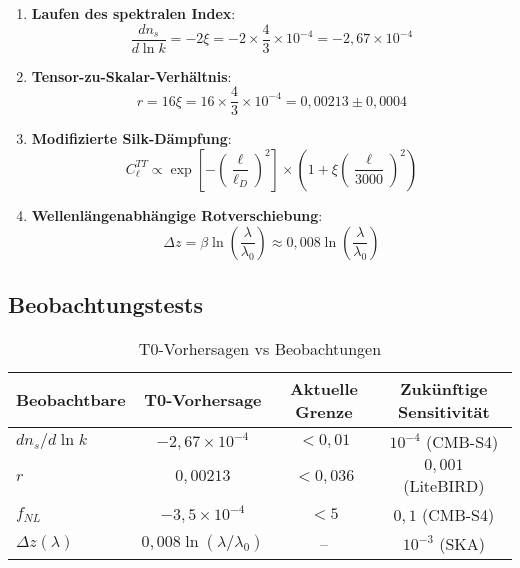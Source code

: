 \documentclass[12pt,a4paper]{article}
\newcommand{\xipar}{\xi}
\theoremstyle{definition}
\theoremstyle{remark}
\begin{document}
	\begin{enumerate}
		\item \textbf{Laufen des spektralen Index}:
		\begin{equation}
			\frac{dn_s}{d\ln k} = -2\xipar = -2 \times \frac{4}{3} \times 10^{-4} = -2,67 \times 10^{-4}
		\end{equation}
		
		\item \textbf{Tensor-zu-Skalar-Verh\"altnis}:
		\begin{equation}
			r = 16\xipar = 16 \times \frac{4}{3} \times 10^{-4} = 0,00213 \pm 0,0004
		\end{equation}
		
		\item \textbf{Modifizierte Silk-D\"ampfung}:
		\begin{equation}
			C_\ell^{TT} \propto \exp\left[-\left(\frac{\ell}{\ell_D}\right)^2\right] \times \left(1 + \xipar \left(\frac{\ell}{3000}\right)^2\right)
		\end{equation}
		
		\item \textbf{Wellenl\"angenabh\"angige Rotverschiebung}:
		\begin{equation}
			\Delta z = \beta \ln\left(\frac{\lambda}{\lambda_0}\right) \approx 0,008 \ln\left(\frac{\lambda}{\lambda_0}\right)
		\end{equation}
	\end{enumerate}
	
	\subsection{Beobachtungstests}
	
	\begin{table}[htbp]
		\centering
		\caption{T0-Vorhersagen vs Beobachtungen}
		\begin{tabular}{lccc}
			\toprule
			Beobachtbare & T0-Vorhersage & Aktuelle Grenze & Zuk\"unftige Sensitivit\"at \\
			\midrule
			$dn_s/d\ln k$ & $-2,67 \times 10^{-4}$ & $< 0,01$ & $10^{-4}$ (CMB-S4) \\
			$r$ & $0,00213$ & $< 0,036$ & $0,001$ (LiteBIRD) \\
			$f_{NL}$ & $-3,5 \times 10^{-4}$ & $< 5$ & $0,1$ (CMB-S4) \\
			$\Delta z(\lambda)$ & $0,008\ln(\lambda/\lambda_0)$ & -- & $10^{-3}$ (SKA) \\
			\bottomrule
		\end{tabular}
	\end{table}
	
\end{document}
